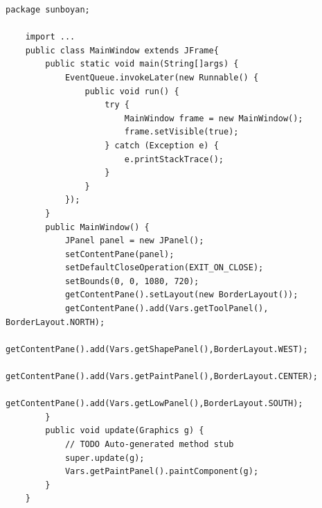 \documentclass{ctexart}
\begin{document}
\begin{lstlisting}[caption = MainWindow.java]
    package sunboyan;

    import ...
    public class MainWindow extends JFrame{
        public static void main(String[]args) {
            EventQueue.invokeLater(new Runnable() {
                public void run() {
                    try {
                        MainWindow frame = new MainWindow();
                        frame.setVisible(true);
                    } catch (Exception e) {
                        e.printStackTrace();
                    }
                }
            });
        }
        public MainWindow() {
            JPanel panel = new JPanel();
            setContentPane(panel);
            setDefaultCloseOperation(EXIT_ON_CLOSE);
            setBounds(0, 0, 1080, 720);
            getContentPane().setLayout(new BorderLayout());
            getContentPane().add(Vars.getToolPanel(), BorderLayout.NORTH);
            getContentPane().add(Vars.getShapePanel(),BorderLayout.WEST);
            getContentPane().add(Vars.getPaintPanel(),BorderLayout.CENTER);
            getContentPane().add(Vars.getLowPanel(),BorderLayout.SOUTH);
        }
        public void update(Graphics g) {
            // TODO Auto-generated method stub
            super.update(g);
            Vars.getPaintPanel().paintComponent(g);
        }
    }        
\end{lstlisting}
\end{document}
